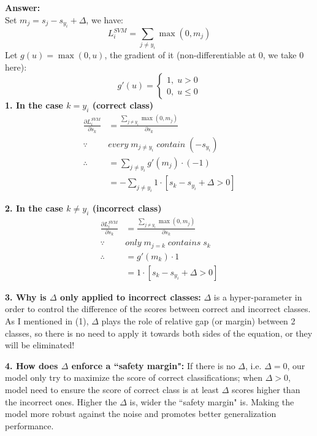 \documentclass[12pt,a4paper]{article}
\begin{document}
	\textbf{Answer:}\\
	Set $m_j = s_j - s_{y_i} + \Delta$, we have:
	\begin{equation}
		L_i^{SVM} = \sum_{j\ne y_i} \max (0, m_j)
	\end{equation}
	Let $g(u)=\max (0,u)$, the gradient of it (non-differentiable at 0, we take 0 here):
	\begin{equation}
		g'(u)=
		\left\{\begin{matrix}
			1,\; u>0
			\\
			0,\; u\le 0
		\end{matrix}\right.
	\end{equation}
	\textbf{1. In the case $k = y_i$ (correct class)}
	\begin{align}
		\frac{\partial L_i^{SVM}}{\partial s_k}&=\frac{\sum_{j\ne y_i} \max (0, m_j)}{\partial s_{k}}
		\\
		\because\;& every \; m_{j\ne y_i} \; contain \; (-s_{y_i})
		\\
		\therefore &=\sum_{j\ne y_i} g'(m_j)\cdot (-1)
		\\
		&=-\sum_{j\ne y_i}1\cdot [s_k - s_{y_i}+\Delta >0]
	\end{align}

	\textbf{2. In the case $k \ne y_i$ (incorrect class)}
	\begin{align}
		\frac{\partial L_i^{SVM}}{\partial s_k}&=\frac{\sum_{j\ne y_i} \max (0, m_j)}{\partial s_{k}}
		\\
		\because\;& only \; m_{j=k} \; contains \; s_k
		\\
		\therefore &=g'(m_k)\cdot 1
		\\
		&=1\cdot [s_k - s_{y_i}+\Delta >0]
	\end{align}
	
	\textbf{3. Why is $\Delta$ only applied to incorrect classes:}
	$\Delta$ is a hyper-parameter in order to control the difference of the scores between correct and incorrect classes. As I mentioned in (1), $\Delta$ plays the role of relative gap (or margin) between 2 classes, so there is no need to apply it towards both sides of the equation, or they will be eliminated! 
	
	\textbf{4. How does $\Delta$ enforce a ``safety margin":}
	If there is no $\Delta$, i.e. $\Delta = 0$, our model only try to maximize the score of correct classifications; when $\Delta > 0$, model need to ensure the score of correct class is at least $\Delta$ scores higher than the incorrect ones. Higher the $\Delta$ is, wider the ``safety margin" is. Making the model more robust against the noise and promotes better generalization performance.
	
\end{document}
